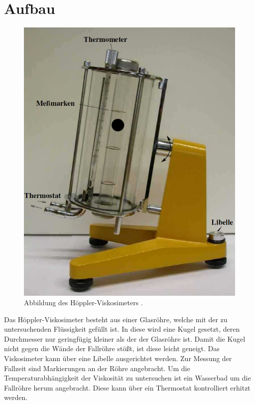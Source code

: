 \section{Aufbau}
\label{sec:Aufbau}
\begin{figure}
	\centering
	\includegraphics[width=\linewidth-100pt,height=\textheight-100pt,keepaspectratio]{content/Bilder/Hoeppler.png}
	\caption{Abbildung des Höppler-Viskosimeters \cite{V207}.}
	\label{fig:Aufbau2}
\end{figure}
Das Höppler-Viskosimeter besteht aus einer Glasröhre, welche mit der zu
untersuchenden Flüssigkeit gefüllt ist. In diese wird eine Kugel gesetzt, deren
Durchmesser nur geringfügig kleiner als der der Glasröhre ist. Damit die Kugel
nicht gegen die Wände der Fallröhre stößt, ist diese leicht geneigt. Das
Viskosimeter kann über eine Libelle ausgerichtet werden. Zur Messung
der Fallzeit sind Markierungen an der Röhre angebracht. Um die Temperaturabhängigkeit
der Viskosität zu untersuchen ist ein Wasserbad um die Fallröhre herum angebracht.
Diese kann über ein Thermostat kontrolliert erhitzt werden.
